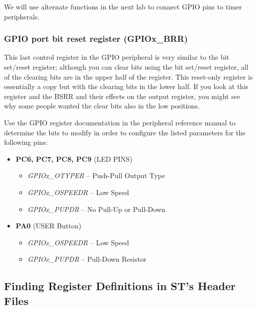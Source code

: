 \documentclass[openany,11pt,fleqn]{book} %
\begin{document}
We will use alternate functions in the next lab to connect GPIO pins to timer peripherals.

\subsubsection{GPIO port bit reset register (GPIOx\_BRR)}
This last control register in the GPIO peripheral is very similar to the bit set/reset register; although you can clear bits using the bit set/reset register, all of the clearing bits are in the upper half of the register. This reset-only register is essentially a copy but with the clearing bits in the lower half. If you look at this register and the BSRR and their effects on the output register, you might see why some people wanted the clear bits also in the low positions.

\begin{exercise}
    
   Use the GPIO register documentation in the peripheral reference manual to determine the bits to modify in order to configure the listed parameters for the following pins:
    
    \begin{itemize}
        \item \textbf{PC6, PC7, PC8, PC9} (LED PINS) 
        \begin{itemize}
            \item \textit{GPIOx\_OTYPER} -- Push-Pull Output Type
            \item \textit{GPIOx\_OSPEEDR} -- Low Speed
            \item \textit{GPIOx\_PUPDR} -- No Pull-Up or Pull-Down
        \end{itemize}
        \item \textbf{PA0} (USER Button)
        \begin{itemize}
            \item \textit{GPIOx\_OSPEEDR} -- Low Speed
            \item \textit{GPIOx\_PUPDR} -- Pull-Down Resistor
        \end{itemize}
    \end{itemize}
\end{exercise}


\subsection{Finding Register Definitions in ST's Header Files}
\end{document}
